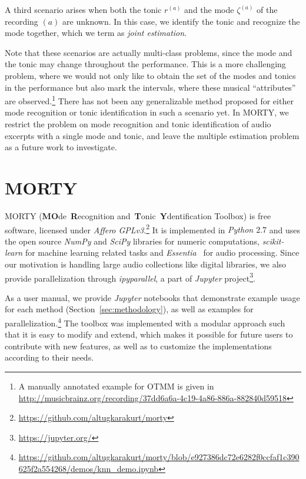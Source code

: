 \documentclass{sig-alternate}
\begin{document}
A third scenario arises when both the tonic $r^{(a)}$ and the mode $\zeta^{(a)}$ of the recording $(a)$ are unknown. In this case, we identify the tonic and recognize the mode together, which we term as \emph{joint estimation}.

Note that these scenarios are actually multi-class problems, since the mode and the tonic may change throughout the performance. This is a more challenging problem, where we would not only like to obtain the set of the modes and tonics in the performance but also mark the intervals, where these musical ``attributes'' are observed.\footnote{A manually annotated example for OTMM is given in \url{http://musicbrainz.org/recording/37dd6a6a-4c19-4a86-886a-882840d59518}} There has not been any generalizable method proposed for either mode recognition or tonic identification in such a scenario yet. In MORTY, we restrict the problem on mode recognition and tonic identification of audio excerpts with a single mode and tonic, and leave the multiple estimation problem as a future work to investigate.

\section{MORTY}\label{sec:morty}

MORTY (\textbf{MO}de~\textbf{R}ecognition and~\textbf{T}onic~\textbf{Y}dentification Toolbox) is free software, licensed under \emph{Affero GPLv3}.\footnote{\url{https://github.com/altugkarakurt/morty}} It is implemented in \emph{Python $2.7$} and uses the open source \emph{NumPy} and \emph{SciPy} libraries for numeric computations, \emph{scikit-learn} for machine learning related tasks and \emph{Essentia}~\cite{bogdanov2013essentia} for audio processing. Since our motivation is handling large audio collections like digital libraries, we also provide parallelization through \emph{ipyparallel}, a part of \emph{Jupyter} project\footnote{\url{https://jupyter.org/}}.

As a user manual, we provide \emph{Jupyter} notebooks that demonstrate example usage for each method (Section~\ref{sec:methodology}), as well as examples for parallelization.\footnote{\url{https://github.com/altugkarakurt/morty/blob/e927386dc72e6282f0ccfaf1c390625f2a554268/demos/knn_demo.ipynb}} The toolbox was implemented with a modular approach such that it is easy to modify and extend, which makes it possible for future users to contribute with new features, as well as to customize the implementations according to their needs.
\end{document}
